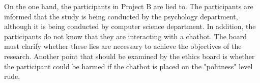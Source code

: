 \documentclass[a4 paper]{article}
\numberwithin{equation}{section}
\newcommand{\0}{\mathbf{0}}
\begin{document}
On the one hand, the participants in Project B are lied to. The participants are informed that the study is being conducted by the psychology department, although it is being conducted by computer science department. In addition, the participants do not know that they are interacting with a chatbot. The board must clarify whether these lies are necessary to achieve the objectives of the research. Another point that should be examined by the ethics board is whether the participant could be harmed if the chatbot is placed on the "politness" level rude.
\end{document}
